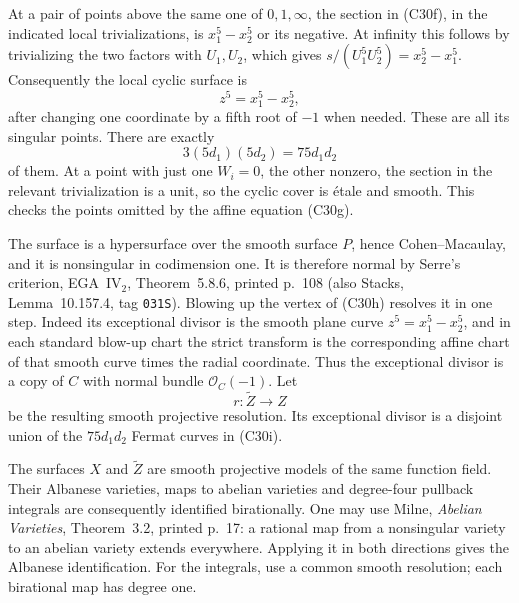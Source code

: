 At a pair of points above the same one of
$0,1,\infty$, the section in (C30f), in the indicated
local trivializations, is $x_1^5-x_2^5$ or its
negative.  At infinity this follows by trivializing
the two factors with $U_1,U_2$, which gives
$s/(U_1^5U_2^5)=x_2^5-x_1^5$.
Consequently the local cyclic surface is
\[
                       z^5=x_1^5-x_2^5,
                                                        \tag{C30h}
\]
after changing one coordinate by a fifth root of $-1$
when needed.  These are all its singular points.
There are exactly
\[
             3(5d_1)(5d_2)=75d_1d_2
                                                        \tag{C30i}
\]
of them.  At a point with just one $W_i=0$, the other
nonzero, the section in the relevant trivialization
is a unit, so the cyclic cover is \'etale and smooth.
This checks the points omitted by the affine equation
(C30g).

The surface is a hypersurface over the smooth surface
$P$, hence Cohen--Macaulay, and it is nonsingular in
codimension one.  It is therefore normal by Serre's
criterion, EGA~IV$_2$, Theorem~5.8.6, printed p.~108
(also Stacks, Lemma~10.157.4, tag \texttt{031S}).
Blowing up the vertex of (C30h) resolves it in one
step.  Indeed its exceptional divisor is the smooth
plane curve $z^5=x_1^5-x_2^5$, and in each standard
blow-up chart the strict transform is the corresponding
affine chart of that smooth curve times the radial
coordinate.  Thus the exceptional divisor is a copy
of $C$ with normal bundle $\mathcal O_C(-1)$.
Let
\[
                       r:\widetilde Z\longrightarrow Z
\]
be the resulting smooth projective resolution.  Its
exceptional divisor is a disjoint union of the
$75d_1d_2$ Fermat curves in (C30i).

The surfaces $X$ and $\widetilde Z$ are smooth
projective models of the same function field.  Their
Albanese varieties, maps to abelian varieties and
degree-four pullback integrals are consequently
identified birationally.  One may use Milne,
\emph{Abelian Varieties}, Theorem~3.2, printed p.~17:
a rational map from a nonsingular variety to an
abelian variety extends everywhere.  Applying it in
both directions gives the Albanese identification.
For the integrals, use a common smooth resolution;
each birational map has degree one.

